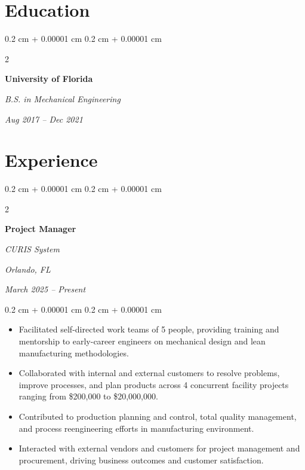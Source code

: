 \documentclass[10pt, letterpaper]{article}
\newenvironment{highlights}{
    \begin{itemize}[
        topsep=0.10 cm,
        parsep=0.10 cm,
        partopsep=0pt,
        itemsep=0pt,
        leftmargin=0.4 cm + 10pt
    ]
}{
    \end{itemize}
} %
\newenvironment{onecolentry}{
    \begin{adjustwidth}{
        0.2 cm + 0.00001 cm
    }{
        0.2 cm + 0.00001 cm
    }
}{
    \end{adjustwidth}
} %
\newenvironment{twocolentry}[2][]{
    \onecolentry
    \def\secondColumn{#2}
    \setcolumnwidth{\fill, 4.5 cm}
    \begin{paracol}{2}
}{
    \switchcolumn \raggedleft \secondColumn
    \end{paracol}
    \endonecolentry
} %
\begin{document}
        \vspace{0.3 cm}


    

    \section{Education}

\vspace{0.2 cm}
        
        \begin{twocolentry}{
            
            
        \textit{Aug 2017 – Dec 2021}}
            \textbf{University of Florida}
            
            \textit{B.S. in Mechanical Engineering}
        \end{twocolentry}

        \vspace{0.15 cm}
        

\vspace{0.3 cm}

    
    \section{Experience}

        \vspace{0.2 cm}

        \begin{twocolentry}{
        \textit{Orlando, FL}    
            
        \textit{March 2025 – Present}}
            \textbf{Project Manager}
            
            \textit{CURIS System}
        \end{twocolentry}

        \vspace{0.10 cm}
        \begin{onecolentry}
            \begin{highlights}
                \item Facilitated self-directed work teams of 5 people, providing training and mentorship to early-career engineers on mechanical design and lean manufacturing methodologies.
                \item Collaborated with internal and external customers to resolve problems, improve processes, and plan products across 4 concurrent facility projects ranging from \$200,000 to \$20,000,000.
                \item Contributed to production planning and control, total quality management, and process reengineering efforts in manufacturing environment.
                \item Interacted with external vendors and customers for project management and procurement, driving business outcomes and customer satisfaction.
            \end{highlights}
        \end{onecolentry}
\end{document}
